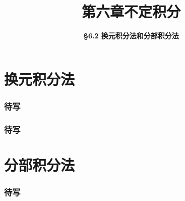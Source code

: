\everymath{\displaystyle}



\title[第六章\\
不定积分]{\texorpdfstring{\LARGE \bfseries 第六章\quad 不定积分}{第六章 不定积分}} %
\author[\smaller \S 6.2\\
换元积分法和分部积分法] %
{\Large \bfseries \S 6.2 换元积分法和分部积分法}
\date{}





\begin{frame}

\titlepage %

\end{frame}



\section{换元积分法}


\begin{frame}
\frametitle{待写}

\end{frame}


\begin{frame}
\frametitle{待写}

\end{frame}


\section{分部积分法}


\begin{frame}
\frametitle{待写}

\end{frame}



